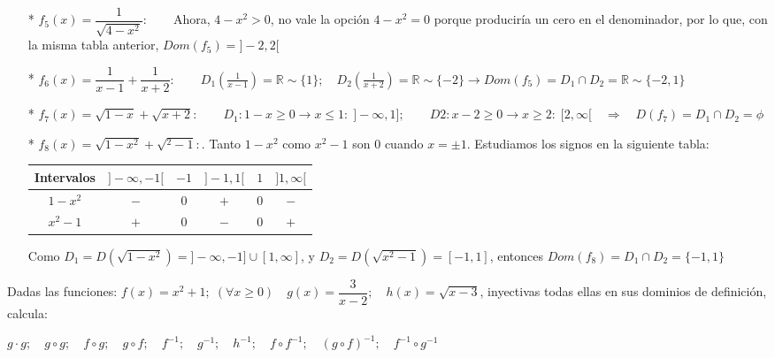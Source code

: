 {\begin{proofw}
\begin{itemize}
			\item[*]$f_5(x)=\dfrac 1 {\sqrt{4-x^2}}: \qquad $Ahora, $4-x^2>0$, no vale la opción $4-x^2=0$ porque producirí­a un cero en el denominador, por lo que, con la misma tabla anterior, $Dom(f_5)=]-2,2[$
			\item[*]$f_6(x)=\dfrac {1}{x-1} + \dfrac {1}{x+2}: \qquad D_1 \left( \frac {1}{x-1} \right)=\mathbb R \sim \{1\}; \quad D_2 \left( \frac {1}{x+2} \right)=\mathbb R \sim \{-2\} \to Dom(f_5)=D_1 \cap D_2 = \mathbb R \sim \{ -2,1 \}$
			
			
			\item[*] $f_7(x)=\sqrt{1-x}+\sqrt{x+2}: \qquad D_1: 1-x\ge 0 \to x\le 1:\; ]-\infty, 1]; \qquad D2: x-2\ge 0 \to x\ge 2: \; [2, \infty[ \quad \Rightarrow    \quad D(f_7)=D_1 \cap D_2 = \phi$
			
			\item[*]$f_8(x)=\sqrt {1-x^2}+\sqrt {^2-1}:$. Tanto $1-x^2$ como $x^2-1$ son $0$ cuando $x=\pm1$. Estudiamos los signos en la siguiente tabla:
			
			\begin{table}[H]
			\centering
			\begin{tabular}{|c|c|c|c|c|c|}
			\hline
 				Intervalos & $]-\infty,-1[$  & $-1$ & $]-1,1[$ & $1$ & $]1,\infty[$ \\ \hline
 				$1-x^2$ & $-$ & $0$ & $+$ & $0$  & $-$ \\ \hline
 				$x^2-1$ & $+$  & $0$  & $-$ & $0$  & $+$  \\ \hline
			\end{tabular}
			\end{table}
			
			Como $D_1=D(\sqrt{1-x^2})=]-\infty,-1]\cup [1,\infty]$, y $D_2=D(\sqrt{x^2-1})=[-1,1]$, entonces $Dom(f_8)=D_1 \cap D_2= \{ -1,1 \}$
			
			
		\end{itemize}
			
		\end{proofw}

		
		
		
		\begin{ejre} Dadas las funciones: $f(x)=x^2+1;\; (\forall x\ge0) \quad g(x)=\dfrac {3}{x-2}; \quad h(x)= \sqrt{x-3}$, inyectivas todas ellas en sus dominios de definición, calcula: 
		
		$g\cdot g;\quad g\circ g; \quad f\circ g; \quad g\circ f; \quad f^{-1}; \quad g^{-1}; \quad h^{-1}; \quad  f\circ f^{-1}; \quad (g \circ f)^{-1}; \quad f^{-1} \circ g^{-1} $ 
		

\end{ejre}}
